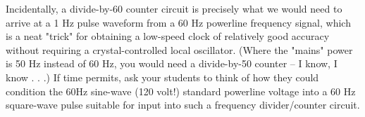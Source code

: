 Incidentally, a divide-by-60 counter circuit is precisely what we would need to arrive at a 1 Hz pulse waveform from a 60 Hz powerline frequency signal, which is a neat "trick" for obtaining a low-speed clock of relatively good accuracy without requiring a crystal-controlled local oscillator.  (Where the "mains" power is 50 Hz instead of 60 Hz, you would need a divide-by-50 counter -- I know, I know . . .)  If time permits, ask your students to think of how they could condition the 60Hz sine-wave (120 volt!) standard powerline voltage into a 60 Hz square-wave pulse suitable for input into such a frequency divider/counter circuit.




